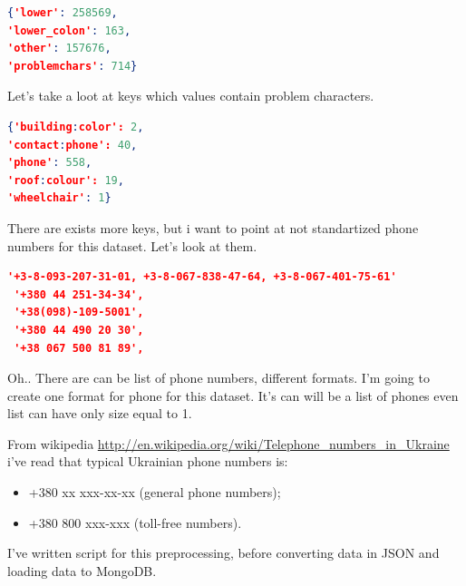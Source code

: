 \documentclass[a4paper,12pt,twoside]{book}
\begin{document}
\begin{lstlisting}[language=json,firstnumber=1]
{'lower': 258569,
'lower_colon': 163,
'other': 157676,
'problemchars': 714}
\end{lstlisting}
Let's take a loot at keys which values contain problem characters.
\begin{lstlisting}[language=json,firstnumber=1]
{'building:color': 2,
'contact:phone': 40,
'phone': 558,
'roof:colour': 19,
'wheelchair': 1}
\end{lstlisting}
There are exists more keys, but i want to point at not standartized phone numbers for this dataset. Let's look at them.
\begin{lstlisting}[language=json, firstnumber=1]
'+3-8-093-207-31-01, +3-8-067-838-47-64, +3-8-067-401-75-61'
 '+380 44 251-34-34',
 '+38(098)-109-5001',
 '+380 44 490 20 30',
 '+38 067 500 81 89',
\end{lstlisting}
Oh.. There are can be list of phone numbers, different formats. I'm going to create one format for phone for this dataset. It's can will be a list of phones even list can have only size equal to 1.\par
From wikipedia \url{http://en.wikipedia.org/wiki/Telephone_numbers_in_Ukraine} i've read that typical Ukrainian phone numbers is:
\begin{itemize}
\item +380 xx xxx-xx-xx (general phone numbers);
\item +380 800 xxx-xxx (toll-free numbers).
\end{itemize}
I've written script for this preprocessing, before converting data in JSON and loading data to MongoDB.
\end{document}
